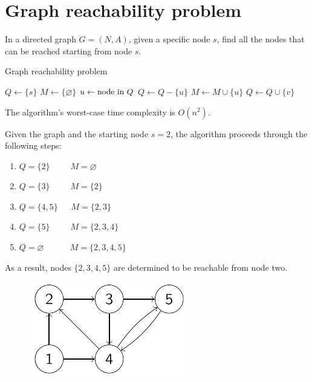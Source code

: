 \documentclass[12pt, a4paper]{report}
\begin{document}
    \section{Graph reachability problem}
    In a directed graph $G=(N,A)$, given a specific node $s$, find all the nodes that can be reached starting from node $s$.
    \begin{algorithm}[H]
        \caption{Graph reachability problem}
            \begin{algorithmic}[1]
                \State $Q \leftarrow \{s\}$
                \State $M \leftarrow \{\varnothing\}$
                    \State $u \leftarrow \textnormal{node in } Q$
                    \State $Q \leftarrow Q-\{u\}$
                    \State $M \leftarrow M \cup \{u\}$
                            \State $Q \leftarrow Q \cup \{v\}$
                        \EndIf
                    \EndFor
                \EndWhile
            \end{algorithmic}
    \end{algorithm}
    The algorithm's worst-case time complexity is $O(n^2)$. 
    \begin{example}
        Given the graph and the starting node $s=2$, the algorithm proceeds through the following steps:
        \begin{enumerate}
            \item $Q=\{2\} \:\:\:\:\:\:\:\:\:\:\: M=\varnothing$
            \item $Q=\{3\} \:\:\:\:\:\:\:\:\:\:\: M=\{2\}$
            \item $Q=\{4,5\} \:\:\:\:\:\:\: M=\{2,3\}$
            \item $Q=\{5\} \:\:\:\:\:\:\:\:\:\:\: M=\{2,3,4\}$
            \item $Q=\varnothing \:\:\:\:\:\:\:\:\:\:\:\:\:\: M=\{2,3,4,5\}$
        \end{enumerate}
        As a result, nodes $\{2,3,4,5\}$ are determined to be reachable from node two.
        \begin{figure}[H]
            \centering
            \includegraphics[width=0.3\linewidth]{images/graphs.png}
        \end{figure}
    \end{example}
\end{document}
